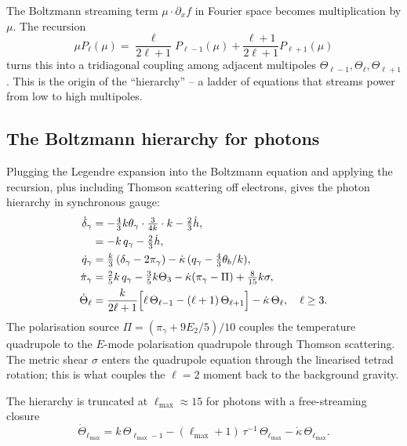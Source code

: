 \begin{aside}
The Boltzmann streaming term $\mu \cdot \partial_x f$ in Fourier space becomes multiplication by $\mu$. The recursion
\[
  \mu P_\ell(\mu) = \frac{\ell}{2\ell + 1} P_{\ell-1}(\mu) + \frac{\ell + 1}{2\ell + 1} P_{\ell + 1}(\mu)
\]
turns this into a tridiagonal coupling among adjacent multipoles $\Theta_{\ell-1}, \Theta_\ell, \Theta_{\ell+1}$. This is the origin of the ``hierarchy'' -- a ladder of equations that streams power from low to high multipoles.
\end{aside}

\subsection{The Boltzmann hierarchy for photons}

Plugging the Legendre expansion into the Boltzmann equation and applying the recursion, plus including Thomson scattering off electrons, gives the photon hierarchy in synchronous gauge:
\begin{align}
  \dot\delta_\gamma &= -\tfrac{4}{3}k\theta_\gamma\cdot\tfrac{3}{4k} \cdot k - \tfrac{2}{3}\dot h, \nonumber\\
                    &= -k\, q_\gamma - \tfrac{2}{3}\dot h, \label{eq:dot_delta_gamma}\\
  \dot q_\gamma &= \tfrac{k}{3}\,(\delta_\gamma - 2 \pi_\gamma) - \dot\kappa\,(q_\gamma - \tfrac{4}{3}\theta_b/k), \label{eq:dot_q_gamma}\\
  \dot\pi_\gamma &= \tfrac{2}{5}k\, q_\gamma - \tfrac{3}{5}k \Theta_3 - \dot\kappa(\pi_\gamma - \Pi) + \tfrac{8}{15}k\sigma, \label{eq:dot_pi_gamma}\\
  \dot\Theta_\ell &= \frac{k}{2\ell+1}\Bigl[\ell\,\Theta_{\ell-1} - (\ell+1)\,\Theta_{\ell+1}\Bigr] - \dot\kappa\,\Theta_\ell, \quad \ell \geq 3. \label{eq:Theta_hierarchy}
\end{align}
The polarisation source $\Pi = (\pi_\gamma + 9 E_2/5)/10$ couples the temperature quadrupole to the $E$-mode polarisation quadrupole through Thomson scattering. The metric shear $\sigma$ enters the quadrupole equation through the linearised tetrad rotation; this is what couples the $\ell = 2$ moment back to the background gravity.

The hierarchy is truncated at $\ell_\mathrm{max} \approx 15$ for photons with a free-streaming closure
\[
  \dot\Theta_{\ell_\mathrm{max}} = k\,\Theta_{\ell_\mathrm{max} - 1} - (\ell_\mathrm{max} + 1)\,\tau^{-1}\, \Theta_{\ell_\mathrm{max}} - \dot\kappa\,\Theta_{\ell_\mathrm{max}}.
\]

